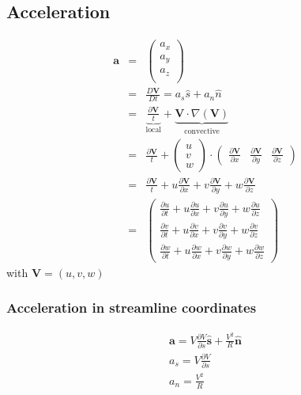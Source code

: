 \documentclass[a4paper]{amsart}
\begin{document}
\subsection{Acceleration}
\begin{eqnarray*}
	\mathbf{a}
	&=&
	\begin{pmatrix}
		a_x\\
		a_y\\
		a_z\\
	\end{pmatrix}
	\nonumber\\
	&=&\frac{D \mathbf{V}}{Dt}=a_s\hat s+a_n\hat n\nonumber\\
	&=&
	\underbrace{\frac{\partial \mathbf{V}}{t}}_{\text{local}}
	+\underbrace{\mathbf{V}\cdot\nabla( \mathbf{V} )}_{\text{convective}}\nonumber\\
	&=&\frac{\partial \mathbf{V}}{t}+
	\begin{pmatrix}
		u\\
		v\\
		w
	\end{pmatrix}
	\cdot
	\begin{pmatrix}
		\frac{\partial\mathbf{V}}{\partial x} &
		\frac{\partial\mathbf{V}}{\partial y} &
		\frac{\partial\mathbf{V}}{\partial z}		
	\end{pmatrix}
	\nonumber\\
	&=&\frac{\partial \mathbf{V}}{t}+u\frac{\partial\mathbf{V}}{\partial x}+v\frac{\partial \mathbf{V}}{\partial y}+w\frac{\partial\mathbf{V}}{\partial z}\nonumber\\
	&=&
	\begin{pmatrix}
		\frac{\partial u}{\partial t} + u\frac{\partial u}{\partial x}+ v\frac{\partial u}{\partial y}+ w\frac{\partial u}{\partial z}\\
		\frac{\partial v}{\partial t} + u\frac{\partial v}{\partial x}+ v\frac{\partial v}{\partial y}+ w\frac{\partial v}{\partial z}\\
		\frac{\partial w}{\partial t} + u\frac{\partial w}{\partial x}+ v\frac{\partial w}{\partial y}+ w\frac{\partial w}{\partial z}
		
	\end{pmatrix}
\end{eqnarray*}
with $\mathbf{V}=(u,v,w)$
\subsubsection{Acceleration in streamline coordinates}
\begin{eqnarray*}
	\mathbf{a}=V\frac{\partial V}{\partial s}\mathbf{\hat s}+\frac{V^2}{R}\mathbf{\hat n}\\
	a_s=V\frac{\partial V}{\partial s}\\a_n=\frac{V^2}{R}
\end{eqnarray*}
\end{document}
